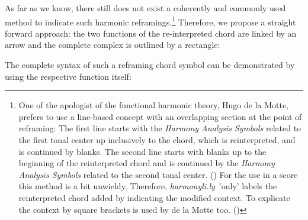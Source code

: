 \documentclass[
  DIV=calc,
  BCOR=5mm,
  12pt,
  headings=small,
  oneside,
  abstract=true,
  toc=bib,
  xcolor=dvipsnames,
  openany,
  ngerman,english]{scrartcl}
\newcommand{\hlyn}[0]{\textit{harmonyli.ly}}
\newcommand{\has}[1]{\textit{Harmony Analysis Symbol#1}}
\begin{document}
As far as we know, there still does not exist a coherently and commonly used
method to indicate such harmonic reframings.\footnote{One of the apologist of the
functional harmonic theory, Hugo de la Motte, prefers to use a line-based
concept with an overlapping section at the point of reframing: The first line
starts with the \has{s} related to the first tonal center up inclusively to the
chord, which is reinterpreted, and is continued by blanks. The second line
starts with blanks up to the beginning of the reinterpreted chord and is
continued by the \has{s} related to the second tonal center. (\cite[cf.][144 et
passim]{Delamotte2011a}) For the use in a score this method is a bit unwieldy.
Therefore, \hlyn\ 'only' labels the reinterpreted chord added by indicating the
modified context. To explicate the context by square brackets is used by de la
Motte too. (\cite[cf.][226 et passim]{Delamotte2011a})} Therefore, we propose a
straight forward approach: the two functions of the re-interpreted chord are
linked by an arrow and the complete complex is outlined by a rectangle:

\begin{center}
\end{center}


The complete syntax of such a reframing chord symbol can be demonstrated by using
the respective function itself:
\end{document}
